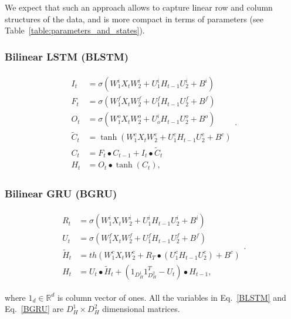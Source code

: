 \documentclass[a4paper,11pt]{article}
\begin{document}
We expect that such an approach allows to capture linear row and column structures of the data, and is more compact in terms of parameters (see Table~\ref{table:parameters_and_states}).


\subsubsection{Bilinear LSTM (BLSTM)} 
\begin{align}
\begin{split}
\label{BLSTM}
I_{t} &=\sigma(W_{1}^{i}X_{t}W_{2}^{i} + U_{1}^{i}H_{t-1}U_{2}^{i}  +  B^{i})\\
F_{t} &=\sigma(W_{1}^{f}X_{t}W_{2}^{f} + U_{1}^{f}H_{t-1}U_{2}^{f}  +  B^{f})\\
O_{t} &=\sigma(W_{1}^{o}X_{t}W_{2}^{o} + U_{o}^{i}H_{t-1}U_{2}^{o}  +  B^{o})\\
\tilde{C}_{t} &=\tanh(W_{1}^{c}X_{t}W_{2}^{c} + U_{1}^{c}H_{t-1}U_{2}^{c}  +  B^{c})\\
C_{t} &= F_{t} \bullet C_{t-1} + I_{t} \bullet \tilde{C}_{t}\\
H_{t} &= O_{t}\bullet \tanh(C_{t}),
\end{split}.
\end{align}



\subsubsection{Bilinear GRU (BGRU)} 
\begin{align}
\begin{split}
\label{BGRU}
R_{t} &=\sigma(W_{1}^{i}X_{t}W_{2}^{i} + U_{1}^{i}H_{t-1}U_{2}^{i}  +  B^{i})\\
U_{t} &=\sigma(W_{1}^{f}X_{t}W_{2}^{f} + U_{1}^{f}H_{t-1}U_{2}^{f}  +  B^{f})\\
\tilde{H}_{t} &= th(W_{1}^{c}X_{t}W_{2}^{c} + R_{T} \bullet (U_{1}^{c}H_{t-1}U_{2}^{c})  +  B^{c})\\
H_{t} &= U_{t}\bullet \tilde{H}_{t} + (1_{D_{H}^{1}}1_{D_{H}^{2}}^{T} - U_{t})\bullet H_{t-1},
\end{split}.
\end{align}

\noindent where $1_{d} \in \mathbb{R}^{d}$ is column vector of ones. All the variables in Eq.~\eqref{BLSTM} and Eq.~\eqref{BGRU} are $D_{H}^{1} \times D_{H}^{2}$ dimensional matrices.

\end{document}

